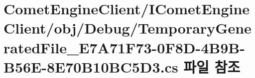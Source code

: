 \hypertarget{_comet_engine_client_2_i_comet_engine_client_2obj_2_debug_2_temporary_generated_file___e7_a71_f7a5f7b3234ee6ee37d19221788c2793bc}{}\section{Comet\+Engine\+Client/\+I\+Comet\+Engine\+Client/obj/\+Debug/\+Temporary\+Generated\+File\+\_\+\+E7\+A71\+F73-\/0\+F8\+D-\/4\+B9\+B-\/\+B56\+E-\/8\+E70\+B10\+B\+C5\+D3.cs 파일 참조}
\label{_comet_engine_client_2_i_comet_engine_client_2obj_2_debug_2_temporary_generated_file___e7_a71_f7a5f7b3234ee6ee37d19221788c2793bc}
